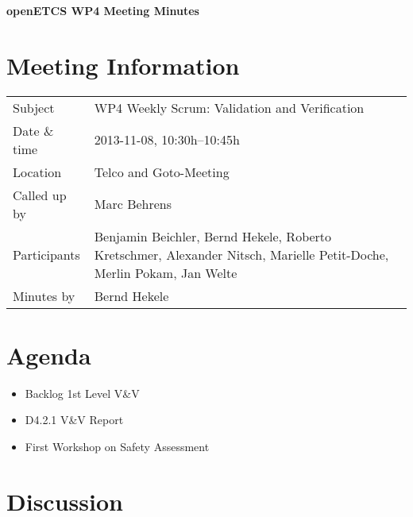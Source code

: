 \documentclass[a4paper, 11pt]{article}
\begin{document}
{\begin{center}\huge\bf openETCS WP4 Meeting Minutes\end{center}}
\section{Meeting Information}

\renewcommand{\arraystretch}{1.5}
\begin{supertabular}{m{.2\textwidth}m{.8\textwidth}}
Subject & WP4 Weekly Scrum: Validation and Verification\\
Date \& time & 2013-11-08, 10:30h--10:45h\\
Location & Telco and Goto-Meeting\\
Called up by & Marc Behrens\\
Participants &
Benjamin Beichler,
Bernd Hekele,
Roberto Kretschmer,
Alexander Nitsch,
Marielle Petit-Doche,
Merlin Pokam,
Jan Welte
\\

Minutes by & Bernd Hekele\\

\end{supertabular}
\renewcommand{\arraystretch}{1.0}


\section{{Agenda}}
\begin{itemize}
\item Backlog 1st Level V\&V
\item D4.2.1 V\&V Report
\item First Workshop on Safety Assessment
\end{itemize}

\section{Discussion}
\end{document}
